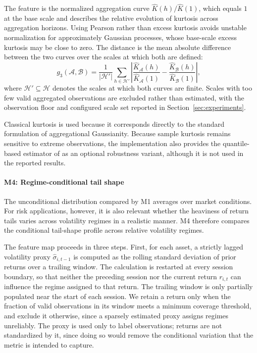 The feature is the normalized aggregation curve
$\hat{K}(h)/\hat{K}(1)$, which equals $1$ at the base scale and describes
the relative evolution of kurtosis across aggregation horizons.
Using Pearson rather than excess kurtosis avoids unstable normalization
for approximately Gaussian processes, whose base-scale excess kurtosis
may be close to zero.
The distance is the mean absolute difference between the two curves over
the scales at which both are defined:
\begin{equation}
g_3(\mathcal{A},\mathcal{B})
= \frac{1}{\lvert\mathcal{H}'\rvert}
\sum_{h\in\mathcal{H}'}
\left\lvert
\frac{\hat{K}_{\mathcal{A}}(h)}
{\hat{K}_{\mathcal{A}}(1)}
-
\frac{\hat{K}_{\mathcal{B}}(h)}
{\hat{K}_{\mathcal{B}}(1)}
\right\rvert,
\label{eq:m3}
\end{equation}
where $\mathcal{H}'\subseteq\mathcal{H}$ denotes the scales at which both
curves are finite.
Scales with too few valid aggregated observations are excluded rather
than estimated, with the observation floor and configured scale set
reported in Section~\ref{sec:experiments}.

Classical kurtosis is used because it corresponds directly to the
standard formulation of aggregational Gaussianity.
Because sample kurtosis remains sensitive to extreme observations, the
implementation also provides the quantile-based estimator of
\citet{moors1988} as an optional robustness variant, although it is not
used in the reported results.

\paragraph{M4: Regime-conditional tail shape}
The unconditional distribution compared by M1 averages over market
conditions.
For risk applications, however, it is also relevant whether the
heaviness of return tails varies across volatility regimes in a
realistic manner.
M4 therefore compares the conditional tail-shape profile across
relative volatility regimes.

The feature map proceeds in three steps.
First, for each asset, a strictly lagged volatility proxy
$\hat{\sigma}_{i,t-1}$ is computed as the rolling standard deviation of
prior returns over a trailing window.
The calculation is restarted at every session boundary, so that neither
the preceding session nor the current return $r_{i,t}$ can influence
the regime assigned to that return.
The trailing window is only partially populated near the start of
each session.
We retain a return only when the fraction of valid observations in its
window meets a minimum coverage threshold, and exclude it otherwise,
since a sparsely estimated proxy assigns regimes unreliably.
The proxy is used only to label observations; returns are not
standardized by it, since doing so would remove the conditional
variation that the metric is intended to capture.

